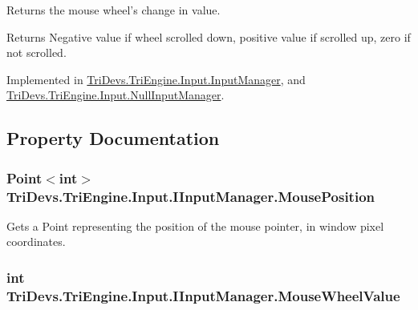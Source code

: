 Returns the mouse wheel's change in value. 

\begin{DoxyReturn}{Returns}
Negative value if wheel scrolled down, positive value if scrolled up, zero if not scrolled.
\end{DoxyReturn}


Implemented in \hyperlink{class_tri_devs_1_1_tri_engine_1_1_input_1_1_input_manager_ac2729ed6240aaab956dc133e51216c5f}{Tri\-Devs.\-Tri\-Engine.\-Input.\-Input\-Manager}, and \hyperlink{class_tri_devs_1_1_tri_engine_1_1_input_1_1_null_input_manager_a3e9e2fd7a4ae4dbc50d12e4650cbf57e}{Tri\-Devs.\-Tri\-Engine.\-Input.\-Null\-Input\-Manager}.



\subsection{Property Documentation}
\hypertarget{interface_tri_devs_1_1_tri_engine_1_1_input_1_1_i_input_manager_a1a8c2795e5b11f9dd7103cbf0a876a95}{
\subsubsection[{Mouse\-Position}]{\setlength{\rightskip}{0pt plus 5cm}Point$<$int$>$ Tri\-Devs.\-Tri\-Engine.\-Input.\-I\-Input\-Manager.\-Mouse\-Position\hspace{0.3cm}{\ttfamily [get]}}}\label{interface_tri_devs_1_1_tri_engine_1_1_input_1_1_i_input_manager_a1a8c2795e5b11f9dd7103cbf0a876a95}


Gets a Point representing the position of the mouse pointer, in window pixel coordinates. 

\hypertarget{interface_tri_devs_1_1_tri_engine_1_1_input_1_1_i_input_manager_a43026ac0472d9e93ed7a9af4678c7ef0}{
\subsubsection[{Mouse\-Wheel\-Value}]{\setlength{\rightskip}{0pt plus 5cm}int Tri\-Devs.\-Tri\-Engine.\-Input.\-I\-Input\-Manager.\-Mouse\-Wheel\-Value\hspace{0.3cm}{\ttfamily [get]}}}\label{interface_tri_devs_1_1_tri_engine_1_1_input_1_1_i_input_manager_a43026ac0472d9e93ed7a9af4678c7ef0}


